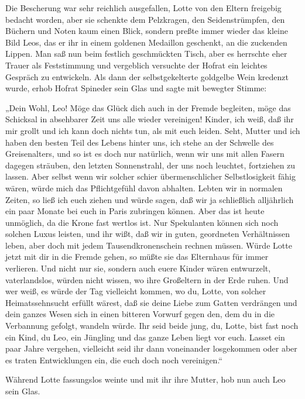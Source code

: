 \tb{* * *}
Die Bescherung war sehr reichlich ausgefallen, Lotte von den Eltern
freigebig bedacht worden, aber sie schenkte dem Pelzkragen, den
Seidenstrümpfen, den Büchern und Noten kaum einen Blick, sondern
preßte immer wieder das kleine Bild Leos, das er ihr in einem
goldenen Medaillon geschenkt, an die zuckenden Lippen. Man saß nun
beim festlich geschmückten Tisch, aber es herrschte eher Trauer als
Feststimmung und vergeblich versuchte der Hofrat ein leichtes
Gespräch zu entwickeln. Als dann der 
selbstgekelterte goldgelbe Wein kredenzt wurde, erhob Hofrat
Spineder sein Glas und sagte mit bewegter Stimme:

„Dein Wohl, Leo! Möge das Glück dich auch in der Fremde begleiten,
möge das Schicksal in absehbarer Zeit uns alle wieder vereinigen!
Kinder, ich weiß, daß ihr mir grollt und ich kann doch nichts tun,
als mit euch leiden. Seht, Mutter und ich haben den besten Teil des
Lebens hinter uns, ich stehe an der Schwelle des Greisenalters, und
so ist es doch nur natürlich, wenn wir uns mit allen Fasern dagegen
sträuben, den letzten Sonnenstrahl, der uns noch leuchtet,
fortziehen zu lassen. Aber selbst wenn wir solcher schier
übermenschlicher Selbstlosigkeit fähig wären, würde mich das
Pflichtgefühl davon abhalten. Lebten wir in normalen Zeiten, so
ließ ich euch ziehen und würde sagen, daß wir ja schließlich
alljährlich ein paar Monate bei euch in Paris zubringen können.
Aber das ist heute unmöglich, da die Krone fast wertlos ist. Nur
Spekulanten können sich noch solchen Luxus leisten, und ihr wißt,
daß wir in guten, geordneten Verhältnissen leben, aber doch mit
jedem Tausendkronenschein rechnen müssen. Würde Lotte jetzt mit dir
in die Fremde gehen, so müßte sie das Elternhaus für immer
verlieren. Und nicht nur sie, sondern auch euere Kinder wären
entwurzelt, vaterlandslos, würden nicht wissen, wo ihre Großeltern
in der Erde ruhen. Und wer weiß, es würde der Tag vielleicht
kommen, wo du, Lotte, von solcher Heimatssehnsucht erfüllt wärest,
daß sie deine Liebe zum Gatten verdrängen und dein ganzes Wesen
sich in einen bitteren Vorwurf gegen den, dem du in die Verbannung
gefolgt, wandeln würde. Ihr seid beide  jung, du,
Lotte, bist fast noch ein Kind, du Leo, ein Jüngling und das ganze
Leben liegt vor euch. Lasset ein paar Jahre vergehen, vielleicht
seid ihr dann voneinander losgekommen oder aber es traten
Entwicklungen ein, die euch doch noch vereinigen.“

Während Lotte fassungslos weinte und mit ihr ihre Mutter, hob nun
auch Leo sein Glas.

